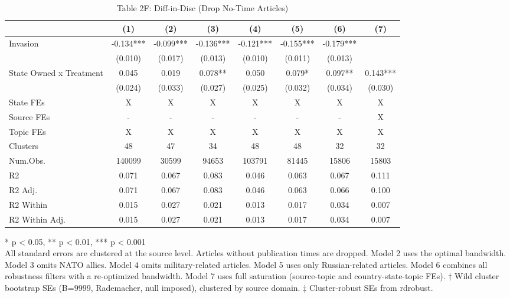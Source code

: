 \begin{table}[!t]
\caption{Table 2F: Diff-in-Disc (Drop No-Time Articles)} 
\fontsize{12.0pt}{14.4pt}\selectfont
\begin{tabular*}{\linewidth}{@{\extracolsep{\fill}}lccccccc}
\toprule
  & (1) & (2) & (3) & (4) & (5) & (6) & (7) \\ 
\midrule\addlinespace[2.5pt]
Invasion & -0.134*** & -0.099*** & -0.136*** & -0.121*** & -0.155*** & -0.179*** &  \\ 
 & (0.010) & (0.017) & (0.013) & (0.010) & (0.011) & (0.013) &  \\ 
State Owned x Treatment & 0.045 & 0.019 & 0.078** & 0.050 & 0.079* & 0.097** & 0.143*** \\ 
{} & {(0.024)} & {(0.033)} & {(0.027)} & {(0.025)} & {(0.032)} & {(0.034)} & {(0.030)} \\ 
State FEs & X & X & X & X & X & X & X \\ 
Source FEs & - & - & - & - & - & - & X \\ 
Topic FEs & X & X & X & X & X & X & X \\ 
Clusters & 48 & 47 & 34 & 48 & 48 & 32 & 32 \\ 
Num.Obs. & 140099 & 30599 & 94653 & 103791 & 81445 & 15806 & 15803 \\ 
R2 & 0.071 & 0.067 & 0.083 & 0.046 & 0.063 & 0.067 & 0.111 \\ 
R2 Adj. & 0.071 & 0.067 & 0.083 & 0.046 & 0.063 & 0.066 & 0.100 \\ 
R2 Within & 0.015 & 0.027 & 0.021 & 0.013 & 0.017 & 0.034 & 0.007 \\ 
R2 Within Adj. & 0.015 & 0.027 & 0.021 & 0.013 & 0.017 & 0.034 & 0.007 \\ 
\bottomrule
\end{tabular*}
\begin{minipage}{\linewidth}
* p < 0.05, ** p < 0.01, *** p < 0.001\\
All standard errors are clustered at the source level. Articles without
publication times are dropped. Model 2 uses the optimal bandwidth. Model
3 omits NATO allies. Model 4 omits military-related articles. Model 5 uses
only Russian-related articles. Model 6 combines all robustness filters with
a re-optimized bandwidth. Model 7 uses full saturation (source-topic and
country-state-topic FEs). † Wild cluster bootstrap SEs (B=9999, Rademacher, null
imposed), clustered by source domain. ‡ Cluster-robust SEs from rdrobust.\\
\end{minipage}
\end{table}

